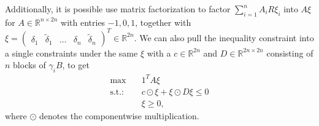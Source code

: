 Additionally, it is possible use matrix factorization to factor
$\sum_{i=1}^{n}A_iR\xi_i$ into $A\xi$ for $A \in \mathbb{R}^{n\times2n}$ with
entries $-1, 0, 1$, together with $\xi = \begin{pmatrix} \delta_1 &
\tilde{\delta}_1 & \hdots & \delta_n & \tilde{\delta}_n \end{pmatrix}^{T} \in
\mathbb{R}^{2n}  $. We can also pull the inequality constraint into a single
constraints under the same $\xi$ with a $c \in \mathbb{R}^{2n}$ and $D \in
\mathbb{R}^{2n \times 2n}$ consisting of $n$ blocks of $\gamma_iB$, to get
\begin{align}
    \text{max} \quad & 1^{T}A\xi \label{eq: quadratically_constrained_general}\\
    \text{s.t.:}\quad & c\odot \xi + \xi \odot D\xi \le 0\\
          & \xi \ge 0,
\end{align}
where $\odot$ denotes the componentwise multiplication.
